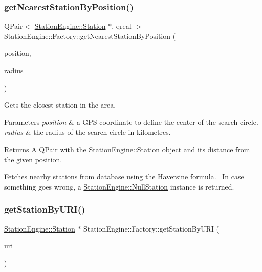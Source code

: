 \subsubsection{\texorpdfstring{getNearestStationByPosition()}{getNearestStationByPosition()}}
{\footnotesize\ttfamily Q\+Pair$<$ \mbox{\hyperlink{classQRail_1_1StationEngine_1_1Station}{Station\+Engine\+::\+Station}} $\ast$, qreal $>$ Station\+Engine\+::\+Factory\+::get\+Nearest\+Station\+By\+Position (\begin{DoxyParamCaption}\item[{const Q\+Geo\+Coordinate \&}]{position,  }\item[{const qreal}]{radius }\end{DoxyParamCaption})}



Gets the closest station in the area. 


\begin{DoxyParams}{Parameters}
{\em position} & a G\+PS coordinate to define the center of the search circle. \\
\hline
{\em radius} & the radius of the search circle in kilometres. \\
\hline
\end{DoxyParams}
\begin{DoxyReturn}{Returns}
A Q\+Pair with the \mbox{\hyperlink{classQRail_1_1StationEngine_1_1Station}{Station\+Engine\+::\+Station}} object and it\textquotesingle{}s distance from the given position.
\end{DoxyReturn}
Fetches nearby stations from database using the Haversine formula.~\newline
 In case something goes wrong, a \mbox{\hyperlink{classQRail_1_1StationEngine_1_1NullStation}{Station\+Engine\+::\+Null\+Station}} instance is returned. \mbox{\label{classQRail_1_1StationEngine_1_1Factory_ad7b0c3ee3716d2a99643c0c7b0b9a9c0}} 
\subsubsection{\texorpdfstring{getStationByURI()}{getStationByURI()}}
{\footnotesize\ttfamily \mbox{\hyperlink{classQRail_1_1StationEngine_1_1Station}{Station\+Engine\+::\+Station}} $\ast$ Station\+Engine\+::\+Factory\+::get\+Station\+By\+U\+RI (\begin{DoxyParamCaption}\item[{const Q\+Url \&}]{uri }\end{DoxyParamCaption})}



